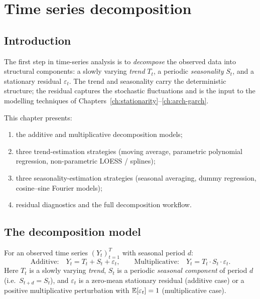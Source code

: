 
\chapter{Time series decomposition}
\label{ch:decomposition}

\section*{Introduction}

The first step in time-series analysis is to \emph{decompose} the
observed data into structural components: a slowly varying
\emph{trend} $T_t$, a periodic \emph{seasonality} $S_t$, and a
stationary residual $\varepsilon_t$. The trend and seasonality carry
the deterministic structure; the residual captures the stochastic
fluctuations and is the input to the modelling techniques of
Chapters~\ref{ch:stationarity}--\ref{ch:arch-garch}.

This chapter presents:
\begin{enumerate}
  \item the additive and multiplicative decomposition models;
  \item three trend-estimation strategies (moving average, parametric
        polynomial regression, non-parametric LOESS / splines);
  \item three seasonality-estimation strategies (seasonal averaging,
        dummy regression, cosine--sine Fourier models);
  \item residual diagnostics and the full decomposition workflow.
\end{enumerate}

\section{The decomposition model}
\label{sec:decomp-model}

\begin{defbox}
\label{def:decomp}
For an observed time series $(Y_t)_{t=1}^{T}$ with seasonal period $d$:
\[
  \text{Additive:}\quad Y_t = T_t + S_t + \varepsilon_t,
  \qquad
  \text{Multiplicative:}\quad Y_t = T_t \cdot S_t \cdot \varepsilon_t.
\]
Here $T_t$ is a slowly varying \emph{trend}, $S_t$ is a periodic
\emph{seasonal component} of period $d$ (i.e.\ $S_{t + d} = S_t$), and
$\varepsilon_t$ is a zero-mean stationary residual (additive case) or
a positive multiplicative perturbation with $\mathbb{E}[\varepsilon_t] = 1$
(multiplicative case).
\end{defbox}


